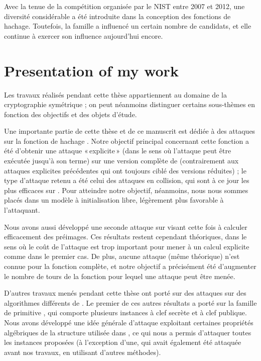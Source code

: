Avec la tenue de la compétition \shathree organisée par le NIST entre 2007 et 2012, une diversité considérable a été introduite dans la conception des fonctions de hachage.
Toutefois, la famille \mdsha a influencé un certain nombre de candidats, et elle continue à exercer son influence aujourd'hui encore.

\chapter[Présentation de mes travaux]{Presentation of my work}

Les travaux réalisés pendant cette thèse appartiennent au domaine de la cryptographie symétrique ; on peut néanmoins distinguer certains sous-thèmes en fonction des objectifs et des objets d'étude.

\medskip

Une importante partie de cette thèse et de ce manuscrit est dédiée à des attaques sur la fonction de hachage \shaone. Notre objectif principal concernant cette fonction a été d'obtenir
une attaque «\,explicite\,» (dans le sens où l'attaque peut être exécutée jusqu'à son terme) sur une version complète de \shaone (contrairement aux attaques explicites précédentes
qui ont toujours ciblé des versions réduites) ; le type d'attaque retenu a été celui des attaques en collision, qui sont à ce jour les plus efficaces sur \shaone.
Pour atteindre notre objectif, néanmoins, nous nous sommes placés dans un modèle à initialisation libre, légèrement plus favorable à l'attaquant.

Nous avons aussi développé une seconde attaque sur \shaone visant cette fois à calculer efficacement des préimages. Ces résultats restent cependant théoriques, dans le sens où le coût
de l'attaque est trop important pour mener à un calcul explicite comme dans le premier cas. De plus, aucune attaque (même théorique) n'est connue pour la fonction complète, et notre
objectif a précisément été d'augmenter le nombre de tours de la fonction pour lequel une attaque peut être menée.

\medskip

D'autres travaux menés pendant cette thèse ont porté sur des attaques sur des algorithmes différents de \shaone. Le premier de ces autres résultats a porté sur la famille de primitive
\asasa, qui comporte plusieurs instances à clef secrète et à clef publique. Nous avons développé une idée générale d'attaque exploitant certaines propriétés algébriques de la
structure utilisée dans \asasa, ce qui nous a permis d'attaquer toutes les instances proposées (à l'exception d'une, qui avait également été attaquée avant nos travaux, en utilisant
d'autres méthodes).

